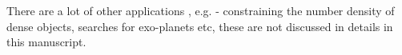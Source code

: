 There are a lot of other applications , e.g. - constraining the number density 
of dense objects, searches
for exo-planets etc, these are not discussed in details in this manuscript. 


